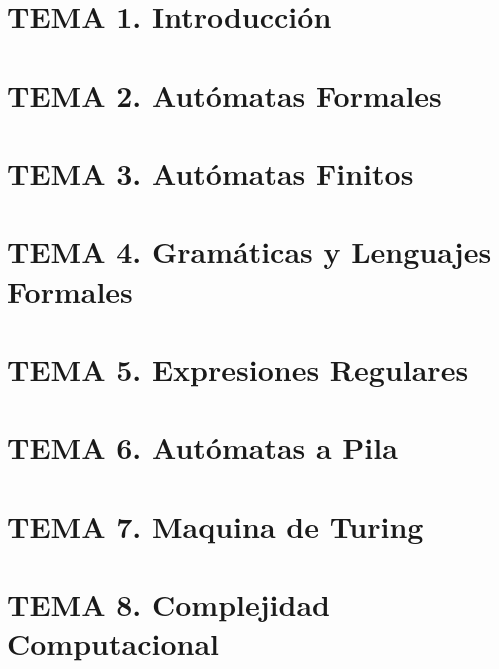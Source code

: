 \documentclass[12pt, twoside, openright]{report} %
\begin{document}





\part{TEMA 1. Introducción}


\part{TEMA 2. Autómatas Formales}


\part{TEMA 3. Autómatas Finitos}


\part{TEMA 4. Gramáticas y Lenguajes Formales}


\part{TEMA 5. Expresiones Regulares}



\part{TEMA 6. Autómatas a Pila}


\part{TEMA 7. Maquina de Turing}


\part{TEMA 8. Complejidad Computacional}

\end{document}
